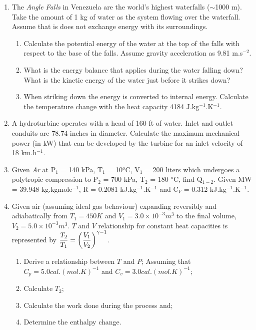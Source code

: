 \documentclass[12pts,a4paper,amsmath,amssymb,floatfix]{article}%
\newcommand{\frc}{\displaystyle\frac}
\begin{document}
\begin{enumerate}[label=\bfseries Problem \arabic*:]
\item\label{Tut01:PotentialEnergy1} The {\it Angle Falls} in Venezuela are the world’s highest waterfalls ($\sim$1000 m). Take the amount of 1 kg of water as the system flowing over the waterfall. Assume that is does not exchange energy with its surroundings.
\begin{enumerate}
\item Calculate the potential energy of the water at the top of the falls with respect to the base of the falls. Assume gravity acceleration as 9.81 m.s$^{-2}$.
\item What is the energy balance that applies during the water falling down? What is the kinetic energy of the water just before it strikes down?
\item When striking down the energy is converted to internal energy. Calculate the temperature change with the heat capacity 4184 J.kg$^{-1}$.K$^{-1}$.
\end{enumerate}


\item\label{Tut01:PotentialEnergy2} A hydroturbine operates with a head of 160 ft of water. Inlet and outlet conduits are 78.74 inches in diameter. Calculate the maximum mechanical power (in kW) that can be developed by the turbine for an inlet velocity of 18 km.h$^{-1}$.


\item\label{Tut01:FirstLawIdealGas1} Given {\it Ar} at P$_{1}$ = 140 kPa, T$_{1}$ = 10$^{o}$C, V$_{1}$ = 200 liters which undergoes a polytropic compression to P$_{2}$ = 700 kPa, T$_{2}$ = 180 $^{o}$C, find Q$_{1-2}$. Given MW = 39.948 kg.kgmole$^{-1}$, R = 0.2081 kJ.kg$^{-1}$.K$^{-1}$ and C$_{V}$ = 0.312 kJ.kg$^{-1}$.K$^{-1}$.


\item\label{Tut01:FirstLawIdealGas2} Given air (assuming ideal gas behaviour) expanding reversibly and adiabatically from $T_{1}=450 K$ and $V_{1}=3.0\times 10^{-3}m^{3}$ to the final volume, $V_{2}=5.0\times 10^{-3}m^{3}$. $T$ and $V$ relationship for constant heat capacities is represented by $\displaystyle\frc{T_{2}}{T_{1}} = \left(\frc{V_{1}}{V_{2}}\right)^{\gamma-1}$.
\begin{enumerate}
\item Derive a relationship between $T$ and $P$; Assuming that $C_{p}= 5.0 cal.\left(mol.K\right)^{-1}$ and $C_{v}=3.0 cal.\left(mol.K\right)^{-1}$;
\item Calculate $T_{2}$;
\item Calculate the work done during the process and;
\item Determine the enthalpy change.
\end{enumerate}


\end{enumerate}
\end{document}
